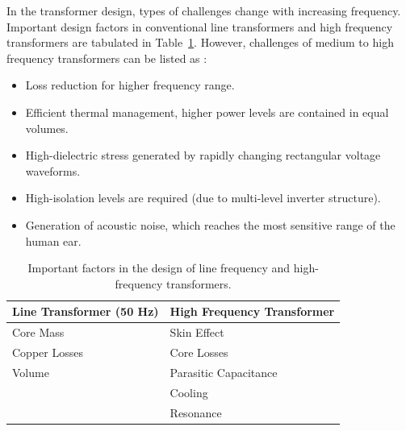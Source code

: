 \documentclass[a4paper, 11pt]{article} %
\begin{document}
In the transformer design, types of challenges change with increasing frequency. Important design factors in conventional line transformers and high frequency transformers are tabulated in Table~\ref{important}.
However, challenges of medium to high frequency transformers can be listed as 
 \cite{Villar2010}:

\begin{itemize}
\item Loss reduction for higher frequency range.
\item Efficient thermal management, higher power levels are contained in equal
volumes.
\item High-dielectric stress generated by rapidly changing rectangular voltage waveforms.
\item High-isolation levels are required (due to multi-level inverter structure).
\item Generation of acoustic noise, which reaches the most sensitive range of the human ear.
\end{itemize}

 \begin{table}[]
\begin{center}
\begin{tabular}{ll}
Line Transformer (50 Hz) & High Frequency Transformer\\
\hline
Core Mass & Skin Effect\\
Copper Losses & Core Losses\\
Volume & Parasitic Capacitance\\
& Cooling \\
& Resonance \\
\hline
\end{tabular} 
\end{center}
\caption{Important factors in the design of line frequency and high-frequency transformers.}
\label{important}
\end{table}
\end{document}
